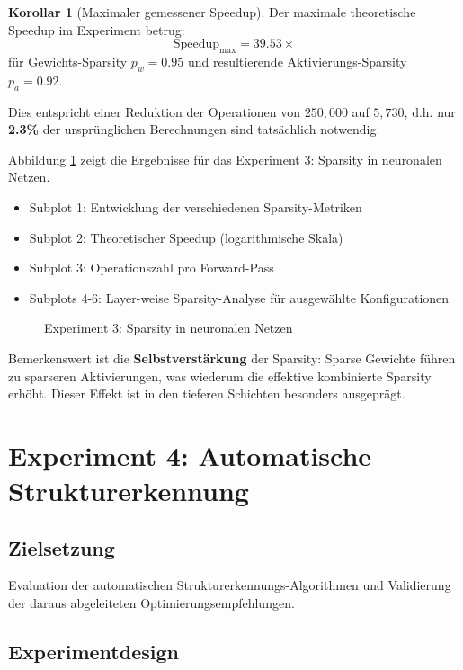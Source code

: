 \documentclass[a4paper,12pt]{report}
\theoremstyle{definition}
\newtheorem{korollar}{Korollar}
\begin{document}
	\begin{korollar}[Maximaler gemessener Speedup]
		Der maximale theoretische Speedup im Experiment betrug:
		\[
		\text{Speedup}_{\max} = 39.53\times
		\]
		für Gewichts-Sparsity $p_w = 0.95$ und resultierende Aktivierungs-Sparsity $p_a = 0.92$.
		
		Dies entspricht einer Reduktion der Operationen von $250{,}000$ auf $5{,}730$, d.h. nur \textbf{2.3\%} der ursprünglichen Berechnungen sind tatsächlich notwendig.
	\end{korollar}
	
	Abbildung \ref{fig:exp3} zeigt die Ergebnisse für das Experiment 3: Sparsity in neuronalen Netzen.
	\begin{itemize}
		\item Subplot 1: Entwicklung der verschiedenen Sparsity-Metriken
		\item Subplot 2: Theoretischer Speedup (logarithmische Skala)
		\item Subplot 3: Operationszahl pro Forward-Pass
		\item Subplots 4-6: Layer-weise Sparsity-Analyse für ausgewählte Konfigurationen
	\end{itemize}
	
	\begin{figure}[H]
		\centering
		\caption{Experiment 3: Sparsity in neuronalen Netzen}
		\label{fig:exp3}
	\end{figure}
	
	Bemerkenswert ist die \textbf{Selbstverstärkung} der Sparsity: Sparse Gewichte führen zu sparseren Aktivierungen, was wiederum die effektive kombinierte Sparsity erhöht. Dieser Effekt ist in den tieferen Schichten besonders ausgeprägt.
	
	\section{Experiment 4: Automatische Strukturerkennung}
	
	\subsection{Zielsetzung}
	
	Evaluation der automatischen Strukturerkennungs-Algorithmen und Validierung der daraus abgeleiteten Optimierungsempfehlungen.
	
	\subsection{Experimentdesign}
	
\end{document}
